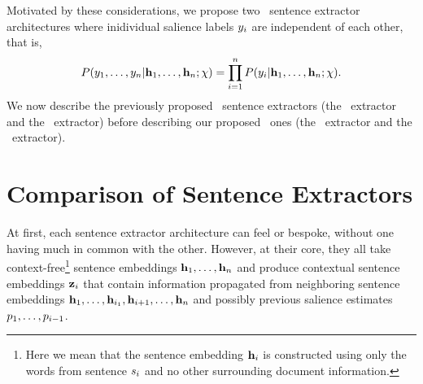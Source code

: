 Motivated by these considerations, we propose two \nonautoregressive~sentence
extractor architectures where inidividual salience labels $y_i$ 
are independent of each other, that is, 
\[P(y_1,\ldots,y_n|\mathbf{h}_1,\ldots,\mathbf{h}_n;\chi) = \prod_{i=1}^n 
P(y_i|\mathbf{h}_1,\ldots,\mathbf{h}_n;\chi).\]
We now describe  the
previously proposed \autoregressive~sentence extractors (the \clext~extractor and  the \srext~extractor) before describing
our proposed \nonautoregressive~ones (the \rnnext~extractor and the \stsext~extractor).


%



%
%

%
%
%










\section{Comparison of Sentence Extractors}

At first, each sentence extractor architecture can feel 
or bespoke, without one having much in common with the other. However,
at their core, they all take context-free\footnote{Here we mean that 
    the sentence embedding $\mathbf{h}_i$ 
    is constructed using only the words from sentence $s_i$ and no 
other surrounding document information.} sentence embeddings $\mathbf{h}_1,\ldots,
\mathbf{h}_n$ and produce contextual sentence embeddings 
$\mathbf{z}_i$ that contain information propagated from neighboring sentence 
embeddings $\mathbf{h}_1,\ldots,\mathbf{h}_{i_1},\mathbf{h}_{i+1},\ldots,\mathbf{h}_n$ and possibly previous salience estimates $p_1,\ldots,p_{i-1}$.





